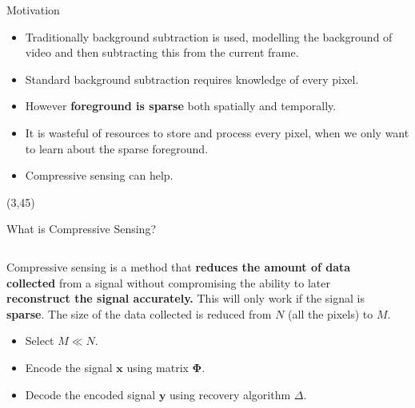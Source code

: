 \documentclass[final]{beamer}
\begin{document}
\begin{frame}{}
\begin{textblock}{36}
\begin{block}{Motivation}
\begin{itemize}
\item Traditionally background subtraction is used, modelling the background of video and then subtracting this from the current frame. 
\item Standard background subtraction requires knowledge of every pixel. 
\item However \textcolor{likePurple}{\textbf{foreground is sparse}} both spatially and temporally. 
\item It is wasteful of resources to store and process every pixel, when we only want to learn about the sparse foreground.
\item Compressive sensing can help.
\end{itemize}
\end{block}
\end{textblock}


\begin{textblock}{36}(3,45)
\begin{block}{What is Compressive Sensing?}

\begin{columns}
\begin{column}{22cm}

Compressive sensing is a method that \textcolor{likePurple}{\textbf{reduces the amount of data collected}} from a signal without compromising the ability to later \textcolor{likePurple}{\textbf{reconstruct the signal accurately.}} This will only work if the signal is  \textcolor{likePurple}{\textbf{sparse}}. The size of the data collected is reduced from $N$ (all the pixels) to $M$.

\begin{itemize}
\item Select $M \ll N$.
\item Encode the signal $\boldsymbol{x}$ using matrix $\boldsymbol{\Phi}$. 
\item Decode the encoded signal $\boldsymbol{y}$ using recovery algorithm $\Delta$. 
\end{itemize}
\end{column}


\begin{column}{13cm}


\end{column}
\end{columns}
\end{block}
\end{textblock}
\end{frame}
\end{document}
